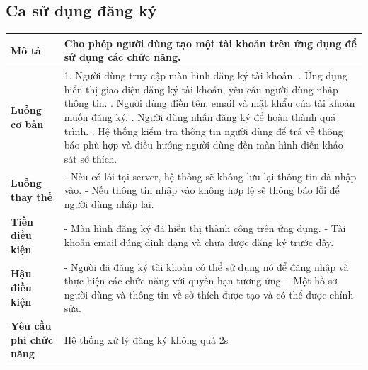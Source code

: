 \subsection{Ca sử dụng đăng ký}
\vspace{0.5cm}


\noindent 
\begin{tabularx}{\linewidth}{| l | X |} 
\hline 
\textbf{Mô tả} & Cho phép người dùng tạo một tài khoản trên ứng dụng để sử dụng các chức năng. \\ 
\hline 
\textbf{Luồng cơ bản} & 1. Người dùng truy cập màn hình đăng ký tài khoản. \newline
                       2. Ứng dụng hiển thị giao diện đăng ký tài khoản, yêu cầu người dùng nhập thông tin. \newline
                       3. Người dùng điền tên, email và mật khẩu của tài khoản muốn đăng ký. \newline
                       4. Người dùng nhấn đăng ký để hoàn thành quá trình. \newline
                       5. Hệ thống kiểm tra thông tin người dùng để trả về thông báo phù hợp và điều hướng người dùng đến màn hình điền khảo sát sở thích. \\ 
\hline 
\textbf{Luồng thay thế} &
                       - Nếu có lỗi tại server, hệ thống sẽ không lưu lại thông tin đã nhập vào. \newline
                       - Nếu thông tin nhập vào không hợp lệ sẽ thông báo lỗi để người dùng nhập lại. \\ 
\hline 
\textbf{Tiền điều kiện} & - Màn hình đăng ký đã hiển thị thành công trên ứng dụng. \newline
                       - Tài khoản email đúng định dạng và chưa được đăng ký trước đây. \\ 
\hline 
\textbf{Hậu điều kiện} & - Người đã đăng ký tài khoản có thể sử dụng nó để đăng nhập và thực hiện các chức năng với quyền hạn tương ứng. \newline
                       - Một hồ sơ người dùng và thông tin về sở thích được tạo và có thể được chỉnh sửa. \\ 
\hline 
\textbf{Yêu cầu phi chức năng} & Hệ thống xử lý đăng ký không quá 2s \\ 
\hline 
\end{tabularx}

\vspace{0.8cm}

